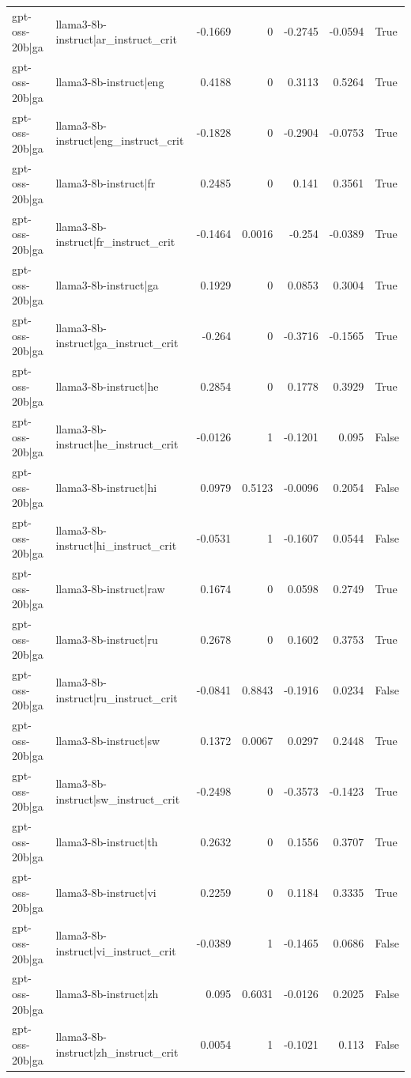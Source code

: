 \begin{table}
\begin{tabular}{l l r r r r l}
gpt-oss-20b|ga & llama3-8b-instruct|ar_instruct_crit & -0.1669 & 0 & -0.2745 & -0.0594 & True \\
gpt-oss-20b|ga & llama3-8b-instruct|eng & 0.4188 & 0 & 0.3113 & 0.5264 & True \\
gpt-oss-20b|ga & llama3-8b-instruct|eng_instruct_crit & -0.1828 & 0 & -0.2904 & -0.0753 & True \\
gpt-oss-20b|ga & llama3-8b-instruct|fr & 0.2485 & 0 & 0.141 & 0.3561 & True \\
gpt-oss-20b|ga & llama3-8b-instruct|fr_instruct_crit & -0.1464 & 0.0016 & -0.254 & -0.0389 & True \\
gpt-oss-20b|ga & llama3-8b-instruct|ga & 0.1929 & 0 & 0.0853 & 0.3004 & True \\
gpt-oss-20b|ga & llama3-8b-instruct|ga_instruct_crit & -0.264 & 0 & -0.3716 & -0.1565 & True \\
gpt-oss-20b|ga & llama3-8b-instruct|he & 0.2854 & 0 & 0.1778 & 0.3929 & True \\
gpt-oss-20b|ga & llama3-8b-instruct|he_instruct_crit & -0.0126 & 1 & -0.1201 & 0.095 & False \\
gpt-oss-20b|ga & llama3-8b-instruct|hi & 0.0979 & 0.5123 & -0.0096 & 0.2054 & False \\
gpt-oss-20b|ga & llama3-8b-instruct|hi_instruct_crit & -0.0531 & 1 & -0.1607 & 0.0544 & False \\
gpt-oss-20b|ga & llama3-8b-instruct|raw & 0.1674 & 0 & 0.0598 & 0.2749 & True \\
gpt-oss-20b|ga & llama3-8b-instruct|ru & 0.2678 & 0 & 0.1602 & 0.3753 & True \\
gpt-oss-20b|ga & llama3-8b-instruct|ru_instruct_crit & -0.0841 & 0.8843 & -0.1916 & 0.0234 & False \\
gpt-oss-20b|ga & llama3-8b-instruct|sw & 0.1372 & 0.0067 & 0.0297 & 0.2448 & True \\
gpt-oss-20b|ga & llama3-8b-instruct|sw_instruct_crit & -0.2498 & 0 & -0.3573 & -0.1423 & True \\
gpt-oss-20b|ga & llama3-8b-instruct|th & 0.2632 & 0 & 0.1556 & 0.3707 & True \\
gpt-oss-20b|ga & llama3-8b-instruct|vi & 0.2259 & 0 & 0.1184 & 0.3335 & True \\
gpt-oss-20b|ga & llama3-8b-instruct|vi_instruct_crit & -0.0389 & 1 & -0.1465 & 0.0686 & False \\
gpt-oss-20b|ga & llama3-8b-instruct|zh & 0.095 & 0.6031 & -0.0126 & 0.2025 & False \\
gpt-oss-20b|ga & llama3-8b-instruct|zh_instruct_crit & 0.0054 & 1 & -0.1021 & 0.113 & False \\

\end{tabular}
\end{table}

